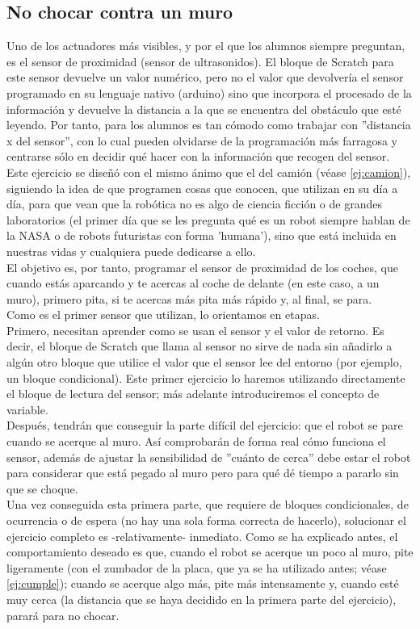 \subsection{No chocar contra un muro}\label{ej:muro}
Uno de los actuadores más visibles, y por el que los alumnos siempre preguntan, es el sensor de proximidad (sensor de ultrasonidos). El bloque de Scratch para este sensor devuelve un valor numérico, pero no el valor que devolvería el sensor programado en su lenguaje nativo (arduino) sino que incorpora el procesado de la información y devuelve la distancia a la que se encuentra del obstáculo que esté leyendo. Por tanto, para los alumnos es tan cómodo como trabajar con ''distancia x del sensor'', con lo cual pueden olvidarse de la programación más farragosa y centrarse sólo en decidir qué hacer con la información que recogen del sensor. \\
Este ejercicio se diseñó con el mismo ánimo que el del camión (véase \ref{ej:camion}), siguiendo la idea de que programen cosas que conocen, que utilizan en su día a día, para que vean que la robótica no es algo de ciencia ficción o de grandes laboratorios (el primer día que se les pregunta qué es un robot siempre hablan de la NASA o de robots futuristas con forma 'humana'), sino que está incluida en nuestras vidas y cualquiera puede dedicarse a ello.\\
El objetivo es, por tanto, programar el sensor de proximidad de los coches, que cuando estás aparcando y te acercas al coche de delante (en este caso, a un muro), primero pita, si te acercas más pita más rápido y, al final, se para. \\
Como es el primer sensor que utilizan, lo orientamos en etapas. \\
Primero, necesitan aprender como se usan el sensor y el valor de retorno. Es decir, el bloque de Scratch que llama al sensor no sirve de nada sin añadirlo a algún otro bloque que utilice el valor que el sensor lee del entorno (por ejemplo, un bloque condicional). Este primer ejercicio lo haremos utilizando directamente el bloque de lectura del sensor; más adelante introduciremos el concepto de variable.\\
Después, tendrán que conseguir la parte difícil del ejercicio: que el robot se pare cuando se acerque al muro. Así comprobarán de forma real cómo funciona el sensor, además de ajustar la sensibilidad de ''cuánto de cerca'' debe estar el robot para considerar que está pegado al muro pero para qué dé tiempo a pararlo sin que se choque.\\
Una vez conseguida esta primera parte, que requiere de bloques condicionales, de ocurrencia o de espera (no hay una sola forma correcta de hacerlo), solucionar el ejercicio completo es -relativamente- inmediato. Como se ha explicado antes, el comportamiento deseado es que, cuando el robot se acerque un poco al muro, pite ligeramente (con el zumbador de la placa, que ya se ha utilizado antes; véase \ref{ej:cumple}); cuando se acerque algo más, pite más intensamente y, cuando esté muy cerca (la distancia que se haya decidido en la primera parte del ejercicio), parará para no chocar.
